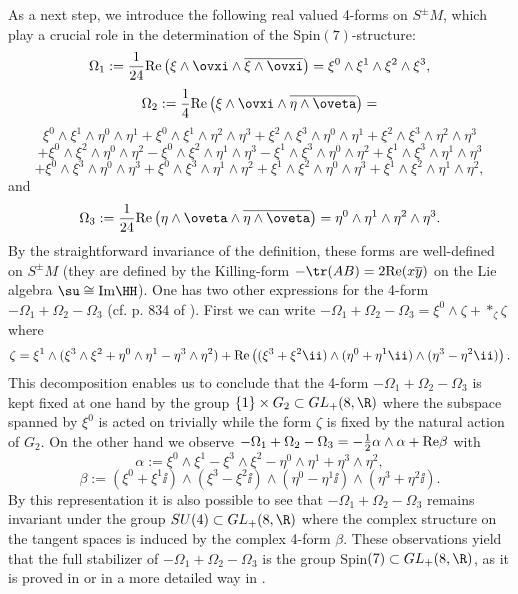 \documentclass[a4paper,12pt,draft]{article}
\begin{document}
As a next step, we introduce the following real valued 4-forms on
$S^\pm M$, which play a crucial role in the determination of the
Spin$(7)$-structure:
\[\Omega_1:={1\over 24}{\rm Re}\left(\xi\wedge\ovxi\wedge
\overline{\xi\wedge\ovxi}\right) 
=\xi^0\wedge\xi^1\wedge\xi^2\wedge\xi^3,\]
\[\Omega_2:={1\over 4}{\rm
Re}\left(\xi\wedge\ovxi\wedge\overline{\eta\wedge\oveta}\right) =\]
\[\xi^0\wedge\xi^1\wedge\eta^0\wedge\eta^1+\xi^0\wedge\xi^1\wedge\eta^2
\wedge\eta^3 +\xi^2\wedge\xi^3\wedge\eta^0\wedge\eta^1+\xi^2\wedge\xi^3
\wedge\eta^2\wedge\eta^3\]
\[+\xi^0\wedge\xi^2\wedge\eta^0\wedge\eta^2-\xi^0\wedge\xi^2\wedge
\eta^1\wedge\eta^3-\xi^1\wedge\xi^3\wedge\eta^0\wedge\eta^2+\xi^1\wedge
\xi^3\wedge\eta^1\wedge\eta^3\]
\[+\xi^0\wedge\xi^3\wedge\eta^0\wedge\eta^3+\xi^0\wedge\xi^3\wedge\eta^1
\wedge\eta^2+\xi^1\wedge\xi^2\wedge\eta^0\wedge\eta^3+\xi^1\wedge
\xi^2\wedge\eta^1\wedge\eta^2,\]
and
\[\Omega_3:={1\over 24}{\rm 
Re}\left(\eta\wedge\oveta\wedge\overline{\eta\wedge\oveta}\right) 
=\eta^0\wedge\eta^1\wedge\eta^2\wedge\eta^3.\]
By the straightforward invariance of the definition, these forms are
well-defined on $S^\pm M$ (they are defined by the Killing-form 
$-\tr (AB)=2{\rm Re}(x\overline{y})$ on the Lie algebra
$\su\cong{\rm Im}\HH$). One has two other expressions for the
4-form $-\Omega_1+\Omega_2-\Omega_3$ (cf. p. 834 of
\cite{bry-sal}). First
we can write $-\Omega_1+\Omega_2-\Omega_3=\xi^0\wedge\zeta
+*_{\zeta}\zeta$ where
\[\zeta =\xi^1\wedge
(\xi^3\wedge\xi^2+\eta^0\wedge\eta^1-\eta^3\wedge\eta^2)+{\rm
Re}\left(
(\xi^3+\xi^2\ii )\wedge (\eta^0+\eta^1\ii )\wedge (\eta^3-\eta^2\ii
)\right) .\] 
This decomposition enables us to conclude
that the 4-form $-\Omega_1+\Omega_2-\Omega_3$ is kept fixed at one hand by
the group $\{ 1\}\times G_2\subset GL_+(8, \R )$ where the subspace
spanned by $\xi^0$ is acted on trivially while the form $\zeta$ is fixed
by the natural action of $G_2$. 
On the other hand we observe $-\Omega_1+\Omega_2-\Omega_3=-{1\over
2}\alpha\wedge\alpha +{\rm Re}\beta$ with
\[\alpha :=\xi^0\wedge\xi^1-\xi^3\wedge\xi^2-\eta^0\wedge\eta^1
+\eta^3\wedge\eta^2,\]
\begin{equation}
\beta :=(\xi^0+\xi^1\ii )\wedge
(\xi^3-\xi^2\ii )\wedge (\eta^0-\eta^1\ii )\wedge (\eta^3+\eta^2\ii ).
\label{komplex}
\end{equation}
By this representation it is also possible to see that
$-\Omega_1+\Omega_2-\Omega_3$ remains invariant under the group
$SU(4)\subset GL_+(8, \R )$ where 
the complex structure on the tangent spaces is induced by 
the complex 4-form $\beta$. These observations yield that the full
stabilizer of $-\Omega_1+\Omega_2-\Omega_3$ is the
group Spin$(7)\subset GL_+(8, \R )$, as it is proved in \cite{bry-sal} or
in a more detailed way in \cite{bry}. 
\end{document}
